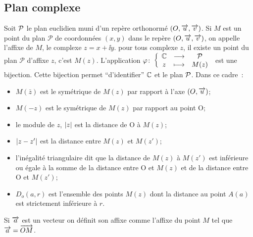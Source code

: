 \subsection{Plan complexe}
\label{subsec:plancomplexe}
%
Soit $\P$ le plan euclidien muni d'un repère orthonormé $(O,\vect{u}, \vect{v})$. Si $M$ est un point du plan $\mathcal{P}$ de coordonnées $(x,y)$ dans le repère $(O,\vect{u}, \vect{v})$, on appelle l'affixe de $M$, le complexe $z=x + \ii y$. pour tous complexe $z$, il existe un point du plan $\mathcal{P}$ d'affixe $z$, c'est $M(z)$. L'application $\fonction{\varphi}{\C}{\P}{z}{M(z)}$ est une bijection. Cette bijection permet ``d'identifier'' $\C$ et le plan $\P$. Dans ce cadre~:
\begin{itemize}
\item $M(\bar{z})$ est le symétrique de $M(z)$ par rapport à l'axe $(O,\vect{u})$;
\item $M(-z)$ est le symétrique de $M(z)$ par rapport au point O;
\item le module de $z$, $\abs{z}$ est la distance de O à $M(z)$;
\item $\abs{z-z'}$ est la distance entre $M(z)$ et $M(z')$;
\item l'inégalité triangulaire dit que la distance de $M(z)$ à $M(z')$ est inférieure ou égale à la somme de la distance entre O et $M(z)$ et de la distance entre O et $M(z')$;
\item $D_o(a,r)$ est l'ensemble des points $M(z)$ dont la distance au point $A(a)$ est strictement inférieure à $r$.
\end{itemize}
Si $\vect{a}$ est un vecteur on définit son affixe comme l'affixe du point $M$ tel que $\vect{a}=\vect{OM}$.




